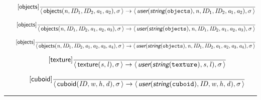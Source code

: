 \documentclass[10pt,leqno]{article}
\newcommand{\artVariable}[1]{\mbox{\em #1\/}}
\newcommand{\artConstructor}[1]{\mbox{\sf #1}}
\newcommand{\artCaseInsensitiveLiteral}[1]{\mbox{\tt #1}}
\newcommand{\artSpecial}[1]{\mbox{\sf\em #1}}
\begin{document}
\begin{equation}
\tag*{[\artConstructor{\sf objects}]}\frac{}{\langle\, \artConstructor{\sf objects}(\artVariable{n}, \artVariable{ID$_{1}$}, \artVariable{ID$_{2}$}, \artVariable{a$_{1}$}, \artVariable{a$_{2}$}), \artVariable{$\sigma$}\,\rangle \rightarrow \langle\, \artSpecial{user}(\artSpecial{string}(\artCaseInsensitiveLiteral{objects}), \artVariable{n}, \artVariable{ID$_{1}$}, \artVariable{ID$_{2}$}, \artVariable{a$_{1}$}, \artVariable{a$_{2}$}), \artVariable{$\sigma$}\,\rangle }
\end{equation}

\begin{equation}
\tag*{[\artConstructor{\sf objects}]}\frac{}{\langle\, \artConstructor{\sf objects}(\artVariable{n}, \artVariable{ID$_{1}$}, \artVariable{ID$_{2}$}, \artVariable{a$_{1}$}, \artVariable{a$_{2}$}, \artVariable{a$_{3}$}), \artVariable{$\sigma$}\,\rangle \rightarrow \langle\, \artSpecial{user}(\artSpecial{string}(\artCaseInsensitiveLiteral{objects}), \artVariable{n}, \artVariable{ID$_{1}$}, \artVariable{ID$_{2}$}, \artVariable{a$_{1}$}, \artVariable{a$_{2}$}, \artVariable{a$_{3}$}), \artVariable{$\sigma$}\,\rangle }
\end{equation}

\begin{equation}
\tag*{[\artConstructor{\sf objects}]}\frac{}{\langle\, \artConstructor{\sf objects}(\artVariable{n}, \artVariable{ID$_{1}$}, \artVariable{ID$_{2}$}, \artVariable{a$_{1}$}, \artVariable{a$_{2}$}, \artVariable{a$_{3}$}, \artVariable{a$_{4}$}), \artVariable{$\sigma$}\,\rangle \rightarrow \langle\, \artSpecial{user}(\artSpecial{string}(\artCaseInsensitiveLiteral{objects}), \artVariable{n}, \artVariable{ID$_{1}$}, \artVariable{ID$_{2}$}, \artVariable{a$_{1}$}, \artVariable{a$_{2}$}, \artVariable{a$_{3}$}, \artVariable{a$_{4}$}), \artVariable{$\sigma$}\,\rangle }
\end{equation}

\begin{equation}
\tag*{[\artConstructor{\sf texture}]}\frac{}{\langle\, \artConstructor{\sf texture}(\artVariable{s}, \artVariable{l}), \artVariable{$\sigma$}\,\rangle \rightarrow \langle\, \artSpecial{user}(\artSpecial{string}(\artCaseInsensitiveLiteral{texture}), \artVariable{s}, \artVariable{l}), \artVariable{$\sigma$}\,\rangle }
\end{equation}

\begin{equation}
\tag*{[\artConstructor{\sf cuboid}]}\frac{}{\langle\, \artConstructor{\sf cuboid}(\artVariable{ID}, \artVariable{w}, \artVariable{h}, \artVariable{d}), \artVariable{$\sigma$}\,\rangle \rightarrow \langle\, \artSpecial{user}(\artSpecial{string}(\artCaseInsensitiveLiteral{cuboid}), \artVariable{ID}, \artVariable{w}, \artVariable{h}, \artVariable{d}), \artVariable{$\sigma$}\,\rangle }
\end{equation}

\hrule
\end{document}
